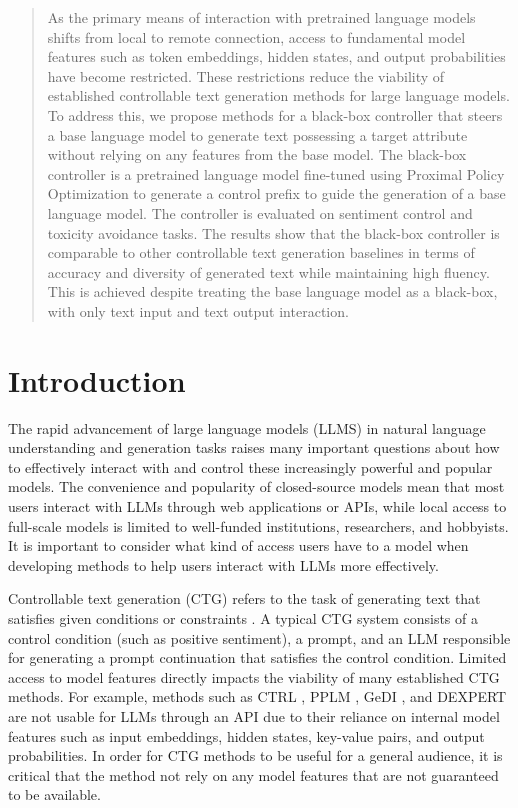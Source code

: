 \documentclass[phd,electronic,oneside,twosidetoc,letterpaper,chaptercenter,parttop,lof]{byumsphd}
\begin{document}
\begin{abstract}
As the primary means of interaction with pretrained language models shifts from local to remote connection, access to fundamental model features such as token embeddings, hidden states, and output probabilities have become restricted.
These restrictions reduce the viability of established controllable text generation methods for large language models.
To address this, we propose methods for a black-box controller that steers a base language model to generate text possessing a target attribute without relying on any features from the base model.
The black-box controller is a pretrained language model fine-tuned using Proximal Policy Optimization to generate a control prefix to guide the generation of a base language model.
The controller is evaluated on sentiment control and toxicity avoidance tasks.
The results show that the black-box controller is comparable to other controllable text generation baselines in terms of accuracy and diversity of generated text while maintaining high fluency.
This is achieved despite treating the base language model as a black-box, with only text input and text output interaction.
\end{abstract}



\section{Introduction}
\label{introduction}

The rapid advancement of large language models (LLMS) in natural language understanding and generation tasks \citep{brown2020gpt3, touvron2023llama, ziegler2019preferences, ouyang2022rlhf, deepseek2025r1} raises many important questions about how to effectively interact with and control these increasingly powerful and popular models.
The convenience and popularity of closed-source models mean that most users interact with LLMs through web applications or APIs, while local access to full-scale models is limited to well-funded institutions, researchers, and hobbyists.
It is important to consider what kind of access users have to a model when developing methods to help users interact with LLMs more effectively.

Controllable text generation (CTG) refers to the task of generating text that satisfies given conditions or constraints \citep{zhang2023survey}. 
A typical CTG system consists of a control condition (such as positive sentiment), a prompt, and an LLM responsible for generating a prompt continuation that satisfies the control condition.
Limited access to model features directly impacts the viability of many established CTG methods.
For example, methods such as CTRL \citep{keskar2019ctrl}, PPLM \citep{dathathri2020plug}, GeDI \citep{krause2021gedi}, and DEXPERT \citep{liu2021dexpert} are not usable for LLMs through an API due to their reliance on internal model features such as input embeddings, hidden states, key-value pairs, and output probabilities.
In order for CTG methods to be useful for a general audience, it is critical that the method not rely on any model features that are not guaranteed to be available.
\end{document}
